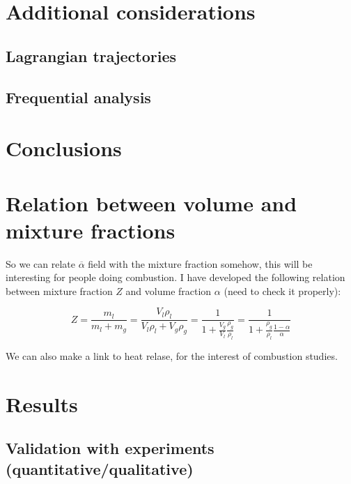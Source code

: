 \clearpage

\section{Additional considerations}

\subsection{Lagrangian trajectories}

\subsection{Frequential analysis}

\section{Conclusions}

\section{Relation between volume and mixture fractions}

So we can relate $\overline{\alpha}$ field with the mixture fraction somehow, this will be interesting for people doing combustion. I have developed the following relation between mixture fraction $Z$ and volume fraction $\alpha$ (need to check it properly):

\begin{equation}
Z = \frac{m_l}{m_l + m_g} = \frac{V_l \rho_l}{V_l \rho_l + V_g \rho_g} = \frac{1}{1 + \frac{V_g}{V_l} \frac{\rho_g}{\rho_l}} = \frac{1}{1 + \frac{\rho_g}{\rho_l} \frac{1 - \alpha}{\alpha}}
\end{equation}


We can also make a link to heat relase, for the interest of combustion studies.




\section{Results}


\subsection{Validation with experiments (quantitative/qualitative)}

